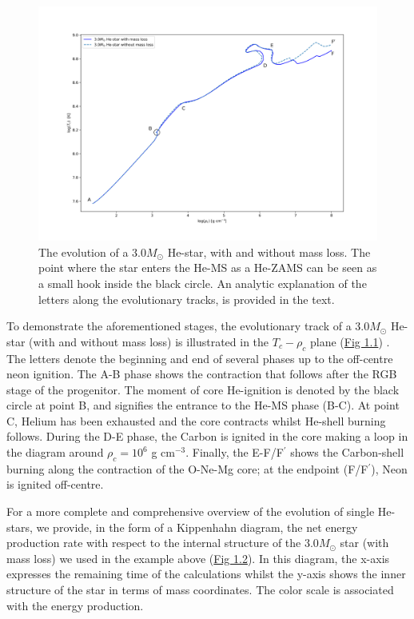 \documentclass[../../main/thesis_msc.tex]{subfiles}
\begin{document}
				\begin{figure}[t]
					\centering
					\includegraphics[scale=0.5]{../figures/chapter1/T_rho_plane_ch1.png}
					\caption{The evolution of a $3.0 M_{\odot}$ He-star, with and without mass loss. The point where the star enters the He-MS as a He-ZAMS can be seen as a small hook inside the black circle. An analytic explanation of the letters along the evolutionary tracks, is provided in the text.}
					\label{fig:T_rho_plane_ch1}
				\end{figure}
				
				To demonstrate the aforementioned stages, the evolutionary track of a $3.0 M_{\odot}$ He-star (with and without mass loss) is illustrated in the $T_c - \rho_c$ plane (\hyperref[fig:T_rho_plane_ch1]{Fig 1.1}) \citep[see also][]{Habets_a, Habets_b, Nomoto1987}. The letters denote the beginning and end of several phases up to the off-centre neon ignition. The A-B phase shows the contraction that follows after the RGB stage of the progenitor. The moment of core He-ignition is denoted by the black circle at point B, and signifies the entrance to the He-MS phase (B-C). At point C, Helium has been exhausted and the core contracts whilst He-shell burning follows. During the D-E phase, the Carbon is ignited in the core making a loop in the diagram around $\rho_c = 10^6$ g cm$^{-3}$. Finally, the E-F/F$^\prime$ shows the Carbon-shell burning along the contraction of the O-Ne-Mg core; at the endpoint (F/F$^\prime$), Neon is ignited off-centre.
				
				For a more complete and comprehensive overview of the evolution of single He-stars, we provide, in the form of a Kippenhahn diagram, the net energy production rate with respect to the internal structure of the $3.0 M_{\odot}$ star (with mass loss) we used in the example above (\hyperref[fig:Kipp_3p0_ch1]{Fig 1.2}). In this diagram, the x-axis expresses the remaining time of the calculations whilst the y-axis shows the inner structure of the star in terms of mass coordinates. The color scale is associated with the energy production.
				
\end{document}
